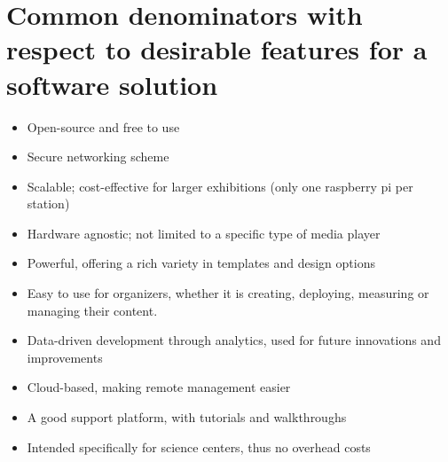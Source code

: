 \documentclass{exam}
\begin{document}
\pagebreak
\section*{Common denominators with respect to desirable features for a software solution}
\bigskip
\begin{itemize}
\item Open-source and free to use
\item Secure networking scheme
\item Scalable; cost-effective for larger exhibitions (only one raspberry pi per station)
\item Hardware agnostic; not limited to a specific type of media player
\item Powerful, offering a rich variety in templates and design options
\item Easy to use for organizers, whether it is creating, deploying, measuring or managing their content.
\item Data-driven development through analytics, used for future innovations and improvements
\item Cloud-based, making remote management easier
\item A good support platform, with tutorials and walkthroughs
\item Intended specifically for science centers, thus no overhead costs
\end{itemize}
\bigskip
\end{document}
